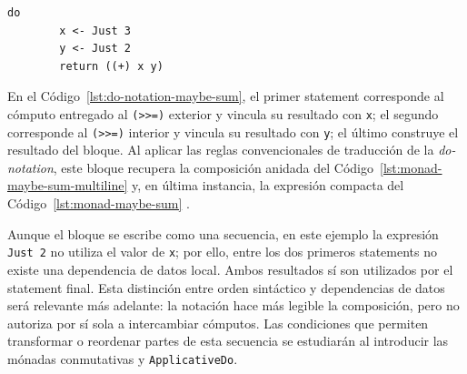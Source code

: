 \noindent\begin{minipage}{\textwidth}
\begin{lstlisting}[style=haskell,caption={Suma monádica sobre \texttt{Maybe} escrita mediante \textit{do-notation}.},label={lst:do-notation-maybe-sum}]
    do
        x <- Just 3
        y <- Just 2
        return ((+) x y)
\end{lstlisting}
\end{minipage}

En el Código~\ref{lst:do-notation-maybe-sum}, el primer statement corresponde al cómputo entregado al \verb|(>>=)| exterior y vincula su resultado con \texttt{x}; el segundo corresponde al \verb|(>>=)| interior y vincula su resultado con \texttt{y}; el último construye el resultado del bloque. Al aplicar las reglas convencionales de traducción de la \textit{do-notation}, este bloque recupera la composición anidada del Código~\ref{lst:monad-maybe-sum-multiline} y, en última instancia, la expresión compacta del Código~\ref{lst:monad-maybe-sum} \cite[sección~3.14]{Haskell2010}.

Aunque el bloque se escribe como una secuencia, en este ejemplo la expresión \texttt{Just 2} no utiliza el valor de \texttt{x}; por ello, entre los dos primeros statements no existe una dependencia de datos local. Ambos resultados sí son utilizados por el statement final. Esta distinción entre orden sintáctico y dependencias de datos será relevante más adelante: la notación hace más legible la composición, pero no autoriza por sí sola a intercambiar cómputos. Las condiciones que permiten transformar o reordenar partes de esta secuencia se estudiarán al introducir las mónadas conmutativas y \texttt{ApplicativeDo}.
